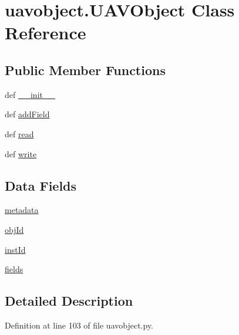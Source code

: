 \hypertarget{classuavobject_1_1_u_a_v_object}{\section{uavobject.\-U\-A\-V\-Object \-Class \-Reference}
\label{classuavobject_1_1_u_a_v_object}
}
\subsection*{\-Public \-Member \-Functions}
\begin{DoxyCompactItemize}
\item 
def \hyperlink{classuavobject_1_1_u_a_v_object_a6744d21db1b6b3009810ccc3699de1e9}{\-\_\-\-\_\-init\-\_\-\-\_\-}
\item 
def \hyperlink{classuavobject_1_1_u_a_v_object_a25042c8f435aa4ea70a6172834795dc1}{add\-Field}
\item 
def \hyperlink{classuavobject_1_1_u_a_v_object_a2c184fbd9d725d8ffeb6c7f3ea4ebf64}{read}
\item 
def \hyperlink{classuavobject_1_1_u_a_v_object_a11ee3cbbc5b35d2caf571e7d1e4391ac}{write}
\end{DoxyCompactItemize}
\subsection*{\-Data \-Fields}
\begin{DoxyCompactItemize}
\item 
\hyperlink{classuavobject_1_1_u_a_v_object_a00f0fd345df36ab7ff5e70d12ed90ce8}{metadata}
\item 
\hyperlink{classuavobject_1_1_u_a_v_object_aff7e18dd61e0464e32b141d3b123209c}{obj\-Id}
\item 
\hyperlink{classuavobject_1_1_u_a_v_object_afb8864f141f2aca9fefa152fd64aeebe}{inst\-Id}
\item 
\hyperlink{classuavobject_1_1_u_a_v_object_af9ce81de37f806ae8b2b50bfa9e6c72b}{fields}
\end{DoxyCompactItemize}


\subsection{\-Detailed \-Description}


\-Definition at line 103 of file uavobject.\-py.




